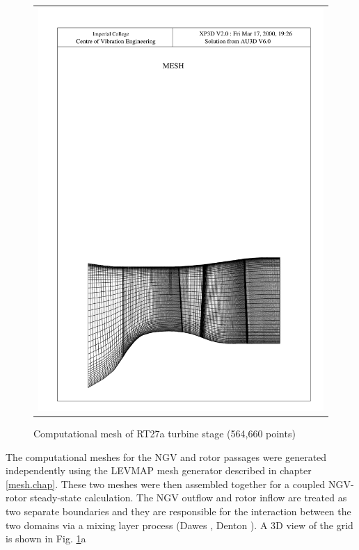 \begin{figure}
\begin{center}
\begin{tabular}{c}
       {\centerline{\includegraphics[width=140mm,clip=t]{CHAP_RT27/FIGURE/mesh3d_3.pdf}}}
  \end{tabular}
 \end{center}
 \vspace{-8mm}
 \caption{Computational mesh of RT27a turbine stage (564,660 points)}
 \label{rt27_mesh1.fig}
\end{figure}
%
 The computational meshes for the NGV and rotor passages were generated
 independently using the LEVMAP mesh generator described in chapter \ref{mesh.chap}.
 These two meshes were then assembled together for a coupled
 NGV-rotor steady-state calculation.
 The NGV outflow and rotor inflow are treated
 as two separate boundaries and they are responsible for the interaction
 between the two domains via a mixing layer process (Dawes ,
 Denton ).
 A 3D view of the grid is shown in Fig. \ref{rt27_mesh1.fig}a
